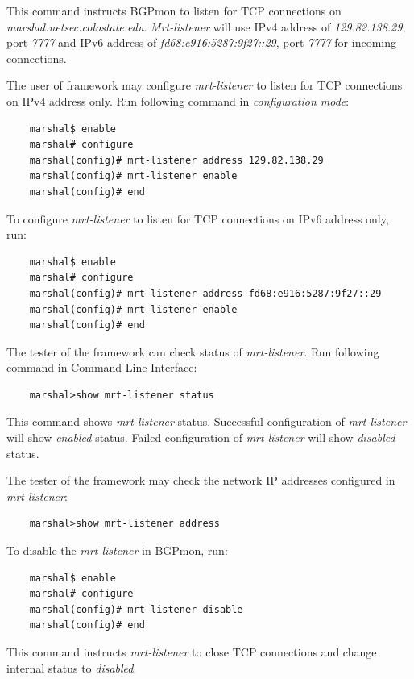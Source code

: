 This command instructs BGPmon to listen for  TCP connections on \emph{marshal.netsec.colostate.edu}.   \emph{Mrt-listener } will use IPv4 address of  \emph{129.82.138.29}, port \emph{7777} and IPv6 address of \emph{fd68:e916:5287:9f27::29}, port \emph{7777} for incoming connections. 

The user of framework may configure \emph{mrt-listener} to listen for TCP connections on IPv4 address only. Run following command in \emph{configuration mode}:
\begin{verbatim}
    marshal$ enable
    marshal# configure
    marshal(config)# mrt-listener address 129.82.138.29
    marshal(config)# mrt-listener enable
    marshal(config)# end
\end{verbatim}

To configure \emph{mrt-listener} to listen for TCP connections on IPv6 address only, run:
\begin{verbatim}
    marshal$ enable
    marshal# configure
    marshal(config)# mrt-listener address fd68:e916:5287:9f27::29
    marshal(config)# mrt-listener enable
    marshal(config)# end
\end{verbatim}





The tester of the framework can check status of    \emph{mrt-listener}. Run following command in Command Line Interface:
\begin{verbatim}
    marshal>show mrt-listener status
\end{verbatim}

This command shows \emph{mrt-listener} status. Successful configuration of  \emph{mrt-listener} will show \emph{enabled} status. Failed configuration of \emph{mrt-listener} will show \emph{disabled} status.

The tester of the framework may check the network IP addresses configured in \emph{mrt-listener}: 
\begin{verbatim}
    marshal>show mrt-listener address
\end{verbatim}

To disable the \emph{mrt-listener}  in BGPmon, run:
\begin{verbatim}
    marshal$ enable
    marshal# configure
    marshal(config)# mrt-listener disable
    marshal(config)# end
\end{verbatim}

This command instructs \emph{mrt-listener} to close TCP connections and change internal status to \emph{disabled}.




